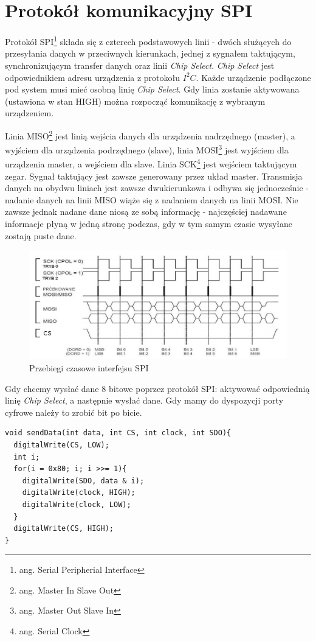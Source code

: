 \documentclass{xmgr}
\begin{document}
\section{Protokół komunikacyjny SPI}
Protokół SPI\footnote{ang. Serial Peripherial Interface} składa się z czterech podstawowych linii - dwóch służących do przesyłania danych w przeciwnych kierunkach, jednej z sygnałem taktującym, synchronizującym transfer danych oraz linii \emph{Chip Select}. \emph{Chip Select} jest odpowiednikiem adresu urządzenia z protokołu $I^2C$. Każde urządzenie podłączone pod system musi mieć osobną linię \emph{Chip Select}. Gdy linia zostanie aktywowana (ustawiona w stan HIGH) można rozpocząć komunikację z wybranym urządzeniem.

Linia MISO\footnote{ang. Master In Slave Out} jest linią wejścia danych dla urządzenia nadrzędnego (master), a wyjściem dla urządzenia podrzędnego (slave), linia MOSI\footnote{ang. Master Out Slave In} jest wyjściem dla urządzenia master, a wejściem dla slave. Linia SCK\footnote{ang. Serial Clock} jest wejściem taktującym zegar. Sygnał taktujący jest zawsze generowany przez układ master. Transmisja danych na obydwu liniach jest zawsze dwukierunkowa i odbywa się jednocześnie - nadanie danych na linii MISO wiąże się z nadaniem danych na linii MOSI. Nie zawsze jednak nadane dane niosą ze sobą informację - najczęściej nadawane informacje płyną w jedną stronę podczas, gdy w tym samym czasie wysyłane zostają puste dane.\cite{Dorra}

\begin{figure}[!h]
    \centering
    \includegraphics[height=0.25\textheight]{images/spi.png}
    \caption{Przebiegi czasowe interfejsu SPI}
\end{figure}

Gdy chcemy wysłać dane 8 bitowe poprzez protokół SPI: aktywować odpowiednią linię \emph{Chip Select}, a następnie wysłać dane. Gdy mamy do dyspozycji porty cyfrowe należy to zrobić bit po bicie.
\begin{lstlisting}[label=bot-dirs-alg,caption=Wysłanie danych 8 bitowych za pomocą protokołu SPI]
void sendData(int data, int CS, int clock, int SDO){
  digitalWrite(CS, LOW);
  int i;
  for(i = 0x80; i; i >>= 1){
    digitalWrite(SDO, data & i);
    digitalWrite(clock, HIGH);
    digitalWrite(clock, LOW);
  }
  digitalWrite(CS, HIGH);
}
\end{lstlisting}
\end{document}
